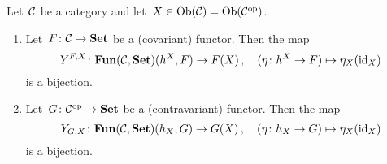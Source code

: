 \begin{lemma}
  \label{yoneda lemma}
  Let~$\mathcal{C}$ be a category and let~$X \in \operatorname{Ob}(\mathcal{C}) = \operatorname{Ob}(\mathcal{C}^{\mathrm{op}})$.
  \begin{enumerate}
    \item
      \label{covariant yoneda}
      Let~$F \colon \mathcal{C} \to \mathbf{Set}$ be a (covariant) functor.
      Then the map
      \[
                Y^{F,X}
        \colon  \mathbf{Fun}(\mathcal{C}, \mathbf{Set})(h^X, F)
        \to     F(X) \,,
        \quad   ( \eta \colon h^X \to F)
        \mapsto \eta_X(\mathrm{id}_X)
      \]
      is a bijection.
    \item
      \label{contravariant yoneda}
      Let~$G \colon \mathcal{C}^{\mathrm{op}} \to \mathbf{Set}$ be a (contravariant) functor.
      Then the map
      \[
                Y_{G,X}
        \colon  \mathbf{Fun}(\mathcal{C}, \mathbf{Set})(h_X, G)
        \to     G(X) \,,
        \quad   ( \eta \colon h_X \to G)
        \mapsto \eta_X(\mathrm{id}_X)
      \]
      is a bijection.
  \end{enumerate}
\end{lemma}


